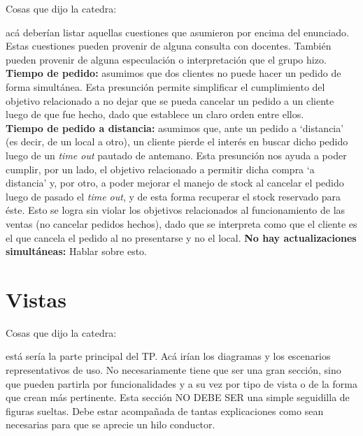 \documentclass[a4paper,10pt]{article}
\begin{document}
Cosas que dijo la catedra:

acá deberían listar aquellas cuestiones que asumieron
por encima del enunciado. Estas cuestiones pueden provenir de alguna
consulta con docentes. También pueden provenir de alguna especulación
o interpretación que el grupo hizo.
\noindent
\textbf{Tiempo de pedido:} asumimos que dos clientes no puede hacer un pedido de forma simultánea. Esta presunción permite simplificar el cumplimiento del objetivo relacionado a no dejar que se pueda cancelar un pedido a un cliente luego de que fue hecho, dado que establece un claro orden entre ellos. \\
\textbf{Tiempo de pedido a distancia:} asumimos que, ante un pedido a `distancia' (es decir, de un local a otro), un cliente pierde el interés en buscar dicho pedido luego de un \textit{time out} pautado de antemano. Esta presunción nos ayuda a poder cumplir, por un lado, el objetivo relacionado a permitir dicha compra `a distancia' y, por otro, a poder mejorar el manejo de stock al cancelar el pedido luego de pasado el \textit{time out}, y de esta forma recuperar el stock reservado para éste. Esto se logra sin violar los objetivos relacionados al funcionamiento de las ventas (no cancelar pedidos hechos), dado que se interpreta como que el cliente es el que cancela el pedido al no presentarse y no el local.
\textbf{No hay actualizaciones simultáneas:} Hablar sobre esto.

\newpage
\section*{Vistas}

Cosas que dijo la catedra:

está sería la parte principal del TP. Acá irían los
diagramas y los escenarios representativos de uso. No necesariamente
tiene que ser una gran sección, sino que pueden partirla por
funcionalidades y a su vez por tipo de vista o de la forma que crean
más pertinente. Esta sección NO DEBE SER una simple seguidilla de
figuras sueltas. Debe estar acompañada de tantas explicaciones como
sean necesarias para que se aprecie un hilo conductor.
\end{document}
